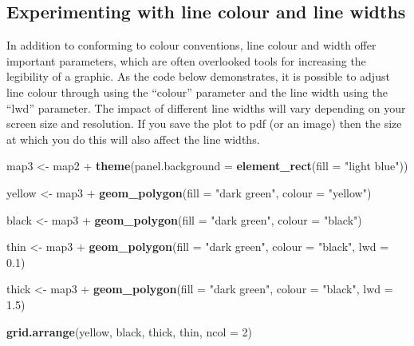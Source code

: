\documentclass[]{article}
\newenvironment{Shaded}{}{}
\newcommand{\KeywordTok}[1]{\textcolor[rgb]{0.00,0.44,0.13}{\textbf{{#1}}}}
\newcommand{\DataTypeTok}[1]{\textcolor[rgb]{0.56,0.13,0.00}{{#1}}}
\newcommand{\DecValTok}[1]{\textcolor[rgb]{0.25,0.63,0.44}{{#1}}}
\newcommand{\FloatTok}[1]{\textcolor[rgb]{0.25,0.63,0.44}{{#1}}}
\newcommand{\StringTok}[1]{\textcolor[rgb]{0.25,0.44,0.63}{{#1}}}
\newcommand{\NormalTok}[1]{{#1}}
\begin{document}
\subsection{Experimenting with line colour and line widths}

In addition to conforming to colour conventions, line colour and width
offer important parameters, which are often overlooked tools for
increasing the legibility of a graphic. As the code below demonstrates,
it is possible to adjust line colour through using the ``colour''
parameter and the line width using the ``lwd'' parameter. The impact of
different line widths will vary depending on your screen size and
resolution. If you save the plot to pdf (or an image) then the size at
which you do this will also affect the line widths.

\begin{Shaded}
\begin{Highlighting}[]
\NormalTok{map3 <- map2 + }\KeywordTok{theme}\NormalTok{(}\DataTypeTok{panel.background =} \KeywordTok{element_rect}\NormalTok{(}\DataTypeTok{fill =} \StringTok{"light blue"}\NormalTok{))}

\NormalTok{yellow <- map3 + }\KeywordTok{geom_polygon}\NormalTok{(}\DataTypeTok{fill =} \StringTok{"dark green"}\NormalTok{, }\DataTypeTok{colour =} \StringTok{"yellow"}\NormalTok{)}

\NormalTok{black <- map3 + }\KeywordTok{geom_polygon}\NormalTok{(}\DataTypeTok{fill =} \StringTok{"dark green"}\NormalTok{, }\DataTypeTok{colour =} \StringTok{"black"}\NormalTok{)}

\NormalTok{thin <- map3 + }\KeywordTok{geom_polygon}\NormalTok{(}\DataTypeTok{fill =} \StringTok{"dark green"}\NormalTok{, }\DataTypeTok{colour =} \StringTok{"black"}\NormalTok{, }\DataTypeTok{lwd =} \FloatTok{0.1}\NormalTok{)}

\NormalTok{thick <- map3 + }\KeywordTok{geom_polygon}\NormalTok{(}\DataTypeTok{fill =} \StringTok{"dark green"}\NormalTok{, }\DataTypeTok{colour =} \StringTok{"black"}\NormalTok{, }\DataTypeTok{lwd =} \FloatTok{1.5}\NormalTok{)}

\KeywordTok{grid.arrange}\NormalTok{(yellow, black, thick, thin, }\DataTypeTok{ncol =} \DecValTok{2}\NormalTok{)}
\end{Highlighting}
\end{Shaded}
\end{document}
